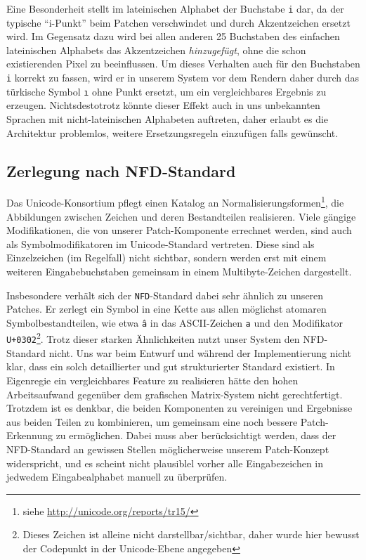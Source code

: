 \documentclass[11pt,a4paper]{article}
\begin{document}
Eine Besonderheit stellt im lateinischen Alphabet der Buchstabe \texttt{i} dar, da der typische \enquote{i-Punkt} beim Patchen verschwindet und durch Akzentzeichen ersetzt wird. Im Gegensatz dazu wird bei allen anderen 25 Buchstaben des einfachen lateinischen Alphabets das Akzentzeichen \textit{hinzugefügt}, ohne die schon existierenden Pixel zu beeinflussen. Um dieses Verhalten auch für den Buchstaben \texttt{i} korrekt zu fassen, wird er in unserem System vor dem Rendern daher durch das türkische Symbol \texttt{ı} ohne Punkt ersetzt, um ein vergleichbares Ergebnis zu erzeugen. Nichtsdestotrotz könnte dieser Effekt auch in uns unbekannten Sprachen mit nicht-lateinischen Alphabeten auftreten, daher erlaubt es die Architektur problemlos, weitere Ersetzungsregeln einzufügen falls gewünscht.

\subsection{Zerlegung nach NFD-Standard}
\label{sec:nfd}
Das Unicode-Konsortium pflegt einen Katalog an Normalisierungsformen\footnote{siehe \url{http://unicode.org/reports/tr15/}}, die Abbildungen zwischen Zeichen und deren Bestandteilen realisieren. Viele gängige Modifikationen, die von unserer Patch-Komponente errechnet werden, sind auch als Symbolmodifikatoren im Unicode-Standard vertreten. Diese sind als Einzelzeichen (im Regelfall) nicht sichtbar, sondern werden erst mit einem weiteren Eingabebuchstaben gemeinsam in einem Multibyte-Zeichen dargestellt.

Insbesondere verhält sich der \texttt{NFD}-Standard dabei sehr ähnlich zu unseren Patches. Er zerlegt ein Symbol in eine Kette aus allen möglichst atomaren Symbolbestandteilen, wie etwa \texttt{â} in das ASCII-Zeichen \texttt{a} und den Modifikator \texttt{U+0302}\footnote{Dieses Zeichen ist alleine nicht darstellbar/sichtbar, daher wurde hier bewusst der Codepunkt in der Unicode-Ebene angegeben}.
Trotz dieser starken Ähnlichkeiten nutzt unser System den NFD-Standard nicht. Uns war beim Entwurf und während der Implementierung nicht klar, dass ein solch detaillierter und gut strukturierter Standard existiert. In Eigenregie ein vergleichbares Feature zu realisieren hätte den hohen Arbeitsaufwand gegenüber dem grafischen Matrix-System nicht gerechtfertigt. Trotzdem ist es denkbar, die beiden Komponenten zu vereinigen und Ergebnisse aus beiden Teilen zu kombinieren, um gemeinsam eine noch bessere Patch-Erkennung zu ermöglichen. Dabei muss aber berücksichtigt werden, dass der NFD-Standard an gewissen Stellen möglicherweise unserem Patch-Konzept widerspricht, und es scheint nicht plausiblel vorher alle Eingabezeichen in jedwedem Eingabealphabet manuell zu überprüfen.
\end{document}
